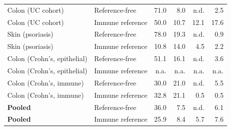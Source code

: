 \begin{table}[htbp]
\begin{tabular}{@{}llrrrr@{}}
Colon (UC cohort) & Reference-free & 71.0 & 8.0 & n.d. & 2.5 \\
Colon (UC cohort) & Immune reference & 50.0 & 10.7 & 12.1 & 17.6 \\
Skin (psoriasis) & Reference-free & 78.0 & 19.3 & n.d. & 0.9 \\
Skin (psoriasis) & Immune reference & 10.8 & 14.0 & 4.5 & 2.2 \\
Colon (Crohn's, epithelial) & Reference-free & 51.1 & 16.1 & n.d. & 3.6 \\
Colon (Crohn's, epithelial) & Immune reference & n.a. & n.a. & n.a. & n.a. \\
Colon (Crohn's, immune) & Reference-free & 30.0 & 21.0 & n.d. & 5.5 \\
Colon (Crohn's, immune) & Immune reference & 32.8 & 21.1 & 0.5 & 0.5 \\
\textbf{Pooled} & Reference-free & 36.0 & 7.5 & n.d. & 6.1 \\
\textbf{Pooled} & Immune reference & 25.9 & 8.4 & 5.7 & 7.6 \\
\bottomrule
\end{tabular}
\end{table}
